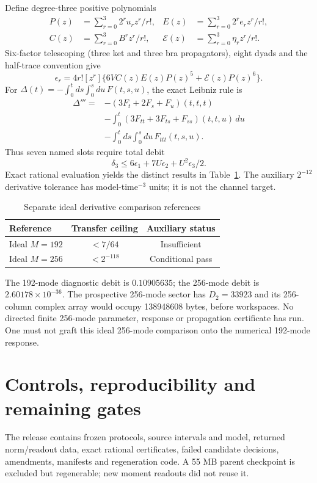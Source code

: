 \documentclass[a4paper,conference]{IEEEtran}
\begin{document}
Define degree-three positive polynomials
\begin{align}
P(z)&=\sum_{r=0}^3 2^ru_rz^r/r!,&E(z)&=\sum_{r=0}^3 2^re_rz^r/r!,\\
C(z)&=\sum_{r=0}^3 B^rz^r/r!,&\mathcal E(z)&=\sum_{r=0}^3\eta_rz^r/r!.
\end{align}
Six-factor telescoping (three ket and three bra propagators), eight dyads and the half-trace convention give
\begin{equation}
\epsilon_r=4r![z^r]\{6VC(z)E(z)P(z)^5+\mathcal E(z)P(z)^6\}.
\end{equation}
For $\Delta(t)=-\int_0^t ds\int_0^s du\,F(t,s,u)$, the exact Leibniz rule is
\begin{align}
\Delta'''={}&-(3F_t+2F_s+F_u)(t,t,t)\\
&-\int_0^t(3F_{tt}+3F_{ts}+F_{ss})(t,t,u)\,du\nonumber\\
&-\int_0^t ds\int_0^s du\,F_{ttt}(t,s,u).\nonumber
\end{align}
Thus seven named slots require total debit
\begin{equation}
\delta_3\le6\epsilon_1+7U\epsilon_2+U^2\epsilon_3/2.
\end{equation}
Exact rational evaluation yields the distinct results in Table~\ref{tab:bridge}. The auxiliary $2^{-12}$ derivative tolerance has model-time$^{-3}$ units; it is not the channel target.
\begin{table}[t]\centering
\caption{Separate ideal derivative comparison references}\label{tab:bridge}
\begin{tabular}{@{}lcc@{}}\toprule
Reference & Transfer ceiling & Auxiliary status\\\midrule
Ideal $M=192$ & $<7/64$ & Insufficient\\
Ideal $M=256$ & $<2^{-118}$ & Conditional pass\\\bottomrule
\end{tabular}
\end{table}
The 192-mode diagnostic debit is $0.10905635$; the 256-mode debit is $2.60178\times10^{-36}$. The prospective 256-mode sector has $D_2=33923$ and its 256-column complex array would occupy 138948608 bytes, before workspaces. No directed finite 256-mode parameter, response or propagation certificate has run. One must not graft this ideal 256-mode comparison onto the numerical 192-mode response.

\section{Controls, reproducibility and remaining gates}
The release contains frozen protocols, source intervals and model, returned norm/readout data, exact rational certificates, failed candidate decisions, amendments, manifests and regeneration code. A 55 MB parent checkpoint is excluded but regenerable; new moment readouts did not reuse it.
\end{document}

